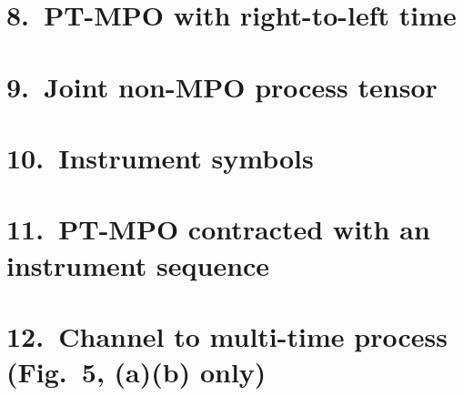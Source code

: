 \documentclass[11pt,a4paper]{article}
\begin{document}
\vspace{1.2em}
\section*{8.\ PT-MPO with right-to-left time}

\vspace{1.2em}
\section*{9.\ Joint non-MPO process tensor}

\vspace{1.2em}
\section*{10.\ Instrument symbols}

\vspace{1.2em}
\section*{11.\ PT-MPO contracted with an instrument sequence}

\vspace{1.2em}
\section*{12.\ Channel to multi-time process (Fig.~5, (a)(b) only)}
\end{document}
